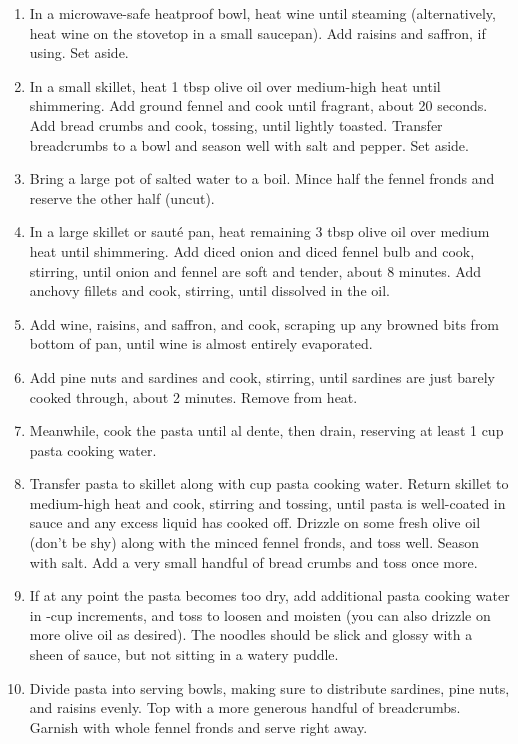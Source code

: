\begin{enumerate}
    \item In a microwave-safe heatproof bowl, heat wine until steaming (alternatively, heat wine on the stovetop in a small saucepan). Add raisins and saffron, if using. Set aside.
    \item In a small skillet, heat 1 tbsp olive oil over medium-high heat until shimmering. Add ground fennel and cook until fragrant, about 20 seconds. Add bread crumbs and cook, tossing, until lightly toasted. Transfer breadcrumbs to a bowl and season well with salt and pepper. Set aside.
    \item Bring a large pot of salted water to a boil. Mince half the fennel fronds and reserve the other half (uncut).
    \item In a large skillet or sauté pan, heat remaining 3 tbsp olive oil over medium heat until shimmering. Add diced onion and diced fennel bulb and cook, stirring, until onion and fennel are soft and tender, about 8 minutes. Add anchovy fillets and cook, stirring, until dissolved in the oil.
    \item Add wine, raisins, and saffron, and cook, scraping up any browned bits from bottom of pan, until wine is almost entirely evaporated.
    \item Add pine nuts and sardines and cook, stirring, until sardines are just barely cooked through, about 2 minutes. Remove from heat.
    \item Meanwhile, cook the pasta until al dente, then drain, reserving at least 1 cup pasta cooking water.
    \item Transfer pasta to skillet along with  cup pasta cooking water. Return skillet to medium-high heat and cook, stirring and tossing, until pasta is well-coated in sauce and any excess liquid has cooked off. Drizzle on some fresh olive oil (don't be shy) along with the minced fennel fronds, and toss well. Season with salt. Add a very small handful of bread crumbs and toss once more.
    \item If at any point the pasta becomes too dry, add additional pasta cooking water in -cup increments, and toss to loosen and moisten (you can also drizzle on more olive oil as desired). The noodles should be slick and glossy with a sheen of sauce, but not sitting in a watery puddle.    
    \item Divide pasta into serving bowls, making sure to distribute sardines, pine nuts, and raisins evenly. Top with a more generous handful of breadcrumbs. Garnish with whole fennel fronds and serve right away.
\end{enumerate}
